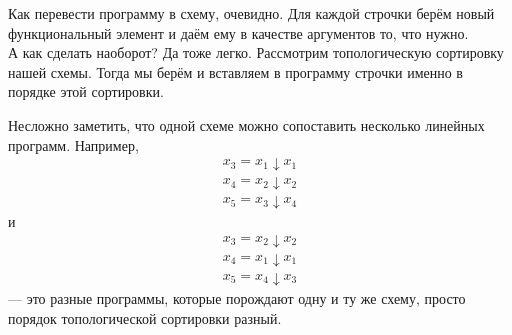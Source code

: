 \documentclass{article}
\begin{document}
\begin{itemize}
        \begin{Proof}
            Как перевести программу в схему, очевидно. Для каждой строчки берём новый функциональный элемент и даём ему в качестве аргументов то, что нужно.\\
            А как сделать наоборот? Да тоже легко. Рассмотрим топологическую сортировку нашей схемы. Тогда мы берём и вставляем в программу строчки именно в порядке этой сортировки.
        \end{Proof}
        \begin{Comment}
            Несложно заметить, что одной схеме можно сопоставить несколько линейных программ. Например, \[\begin{split}
                x_3=x_1\downarrow x_1\\
                x_4=x_2\downarrow x_2\\
                x_5=x_3\downarrow x_4
            \end{split}\]
            и \[\begin{split}
                x_3=x_2\downarrow x_2\\
                x_4=x_1\downarrow x_1\\
                x_5=x_4\downarrow x_3
            \end{split}\] --- это разные программы, которые порождают одну и ту же схему, просто порядок топологической сортировки разный.
        \end{Comment}
        \begin{Proof}

\end{Proof}
\end{itemize}
\end{document}
